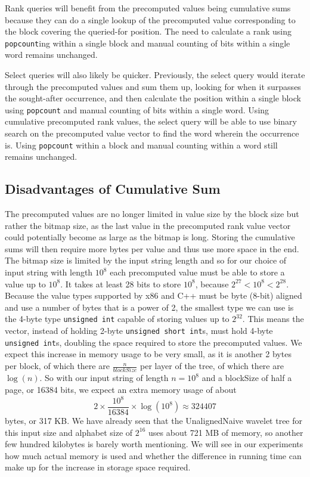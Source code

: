 Rank queries will benefit from the precomputed values being cumulative sums because they can do a single lookup of the precomputed value corresponding to the block covering the queried-for position.
The need to calculate a rank using \texttt{popcount}ing within a single block and manual counting of bits within a single word remains unchanged.

Select queries will also likely be quicker.
Previously, the select query would iterate through the precomputed values and sum them up, looking for when it surpasses the sought-after occurrence, and then calculate the position within a single block using \texttt{popcount} and manual counting of bits within a single word.
Using cumulative precomputed rank values, the select query will be able to use binary search on the precomputed value vector to find the word wherein the occurrence is.
Using \texttt{popcount} within a block and manual counting within a word still remains unchanged.

\subsection{Disadvantages of Cumulative Sum}
The precomputed values are no longer limited in value size by the block size but rather the bitmap size, as the last value in the precomputed rank value vector could potentially become as large as the bitmap is long.
Storing the cumulative sums will then require more bytes per value and thus use more space in the end.
The bitmap size is limited by the input string length and so for our choice of input string with length $10^8$ each precomputed value must be able to store a value up to $10^8$.
It takes at least 28 bits to store $10^8$, because $2^{27} < 10^8 < 2^{28}$.
Because the value types supported by x86 and C++ must be byte (8-bit) aligned and use a number of bytes that is a power of 2, the smallest type we can use is the 4-byte type \texttt{unsigned int} capable of storing values up to $2^{32}$.
This means the vector, instead of holding 2-byte \texttt{unsigned short int}s, must hold 4-byte \texttt{unsigned int}s, doubling the space required to store the precomputed values.
We expect this increase in memory usage to be very small, as it is another 2 bytes per block, of which there are $\frac{n}{blockSize}$ per layer of the tree, of which there are $\log(n)$.
So with our input string of length $n = 10^8$ and a blockSize of half a page, or 16384 bits, we expect an extra memory usage of about
\[ 2 \times \frac{10^8}{16384} \times \log(10^8) \approx 324407\]
bytes, or 317 KB.
We have already seen that the UnalignedNaive wavelet tree for this input size and alphabet size of $2^{16}$ uses about 721 MB of memory, so another few hundred kilobytes is barely worth mentioning.
We will see in our experiments how much actual memory is used and whether the difference in running time can make up for the increase in storage space required.


